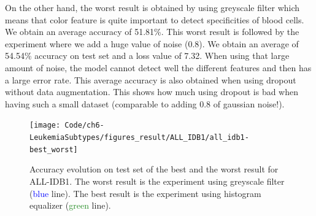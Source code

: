 \documentclass[11pt, openany]{report}
\theoremstyle{plain}
\theoremstyle{definition}
\theoremstyle{remark}
\begin{document}
On the other hand, the worst result is obtained by using greyscale filter which means that color feature is quite important to detect specificities of blood cells. We obtain an average accuracy of 51.81\%. This worst result is followed by the experiment where we add a huge value of noise (0.8). We obtain an average of 54.54\% accuracy on test set and a loss value of 7.32. When using that large amount of noise, the model cannot detect well the different features and then has a large error rate. This average accuracy is also obtained when using dropout without data augmentation. This shows how much using dropout is bad when having such a small dataset (comparable to adding 0.8 of gaussian noise!).  

\begin{figure}[H]
  \centering
  \texttt{[image: Code/ch6-LeukemiaSubtypes/figures\_result/ALL\_IDB1/all\_idb1-best\_worst]}
  \caption{Accuracy evolution on test set of the best and the worst result for ALL-IDB1. The worst result is the experiment using greyscale filter (\textcolor{blue}{blue} line). The best result is the experiment using histogram equalizer (\textcolor{ForestGreen}{green} line).}
  \label{fig:all_idb1-best_worst}
\end{figure}
\end{document}
